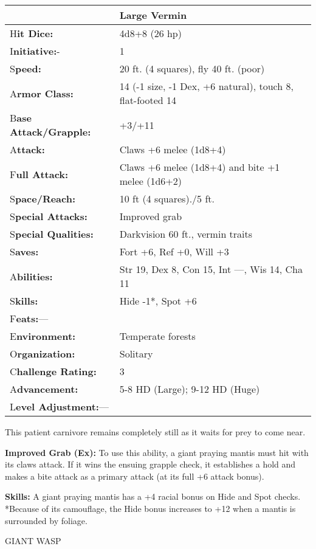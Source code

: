 \documentclass{article}
\begin{document}
\begin{tabular}{|>{\raggedright}p{91pt}|>{\raggedright}p{220pt}|}
\hline
  & Large Vermin\tabularnewline
\hline
H\textbf{it Dice:} & 4d8+8 (26 hp)\tabularnewline
\hline
I\textbf{nitiative:}- & 1\tabularnewline
\hline
S\textbf{peed:} & 20 ft. (4 squares), fly 40 ft. (poor)\tabularnewline
\hline
A\textbf{rmor Class:} & 14 (-1 size, -1 Dex, +6 natural), touch 8, flat-footed 
14\tabularnewline
\hline
B\textbf{ase Attack/Grapple:} & +3/+11\tabularnewline
\hline
A\textbf{ttack:} & Claws +6 melee (1d8+4)\tabularnewline
\hline
F\textbf{ull Attack:} & Claws +6 melee (1d8+4) and bite +1 melee (1d6+2)\tabularnewline
\hline
S\textbf{pace/Reach:} & 10 ft (4 squares)./5 ft.\tabularnewline
\hline
S\textbf{pecial Attacks:} & Improved grab\tabularnewline
\hline
S\textbf{pecial Qualities:} & Darkvision 60 ft., vermin traits\tabularnewline
\hline
S\textbf{aves:} & Fort +6, Ref +0, Will +3\tabularnewline
\hline
A\textbf{bilities:} & Str 19, Dex 8, Con 15, Int ---, Wis 14, Cha 11\tabularnewline
\hline
S\textbf{kills:} & Hide -1*, Spot +6\tabularnewline
\hline
F\textbf{eats:}--- & \tabularnewline
\hline
E\textbf{nvironment:} & Temperate forests\tabularnewline
\hline
O\textbf{rganization:} & Solitary\tabularnewline
\hline
C\textbf{hallenge Rating:} & 3\tabularnewline
\hline
A\textbf{dvancement:} & 5-8 HD (Large); 9-12 HD (Huge)\tabularnewline
\hline
L\textbf{evel Adjustment:}--- & \tabularnewline
\hline
\end{tabular}

This patient carnivore remains completely still as it waits for prey to come near.

\textbf{Improved Grab (Ex):} To use this ability, a giant praying mantis must hit 
with its claws attack. If it wins the ensuing grapple check, it establishes a hold 
and makes a bite attack as a primary attack (at its full +6 attack bonus).

\textbf{Skills:} A giant praying mantis has a +4 racial bonus on Hide and Spot 
checks. *Because of its camouflage, the Hide bonus increases to +12 when a mantis 
is surrounded by foliage.

\vspace{12pt}
GIANT WASP
\end{document}
